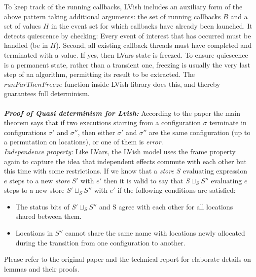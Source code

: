 \documentclass[twocolumn]{article}
\begin{document}
To keep track of the running callbacks, LVish includes an auxiliary form of the above pattern taking additional arguments: the set of running callbacks $B$ and a set of values $H$ in the event set for which callbacks have already been launched. It detects quiescence by checking: Every event of interest that has occurred must be handled (be in $H$). Second, all existing callback threads must have completed and terminated with a value. If yes, then LVars state is freezed. To ensure quiescence is a permanent state, rather than a transient one, freezing is usually the very last step of an algorithm, permitting its result to be extracted. The $runParThenFreeze$ function inside LVish library does this, and thereby guarantees full determinism.\\ \\
\textbf{\textit{Proof of Quasi determinism for Lvish:}} According to the paper\cite{lkuper2} the main theorem says that if two executions starting from a configuration $\sigma$ terminate in configurations $\sigma{'}$ and $\sigma{''}$, then either $\sigma{'}$ and $\sigma{''}$ are the same configuration (up to a permutation on locations), or one of them is \emph{error}.\\
\textit{Independence property:} Like LVars, the LVish model uses the frame property again to capture the idea that independent effects commute with each other but this time with some restrictions. If we know that a \emph{store} $S$ evaluating expression $e$ steps to a new \emph{store} $S{'}$ with $e{'}$ then it is valid to say that $S\sqcup_{S}S''$ evaluating $e$ steps to a new store $S'\sqcup_{S}S''$ with $e'$ if the following conditions are satisfied:
\begin{itemize}
\item The status bits of $S'\sqcup_{S}S''$ and S agree with each other for all locations shared between them.
\item Locations in $S''$ cannot share the same name with locations newly allocated during the transition from one configuration
to another.
\end{itemize}
Please refer to the original paper and the technical report for elaborate details on lemmas and their proofs.
\end{document}
